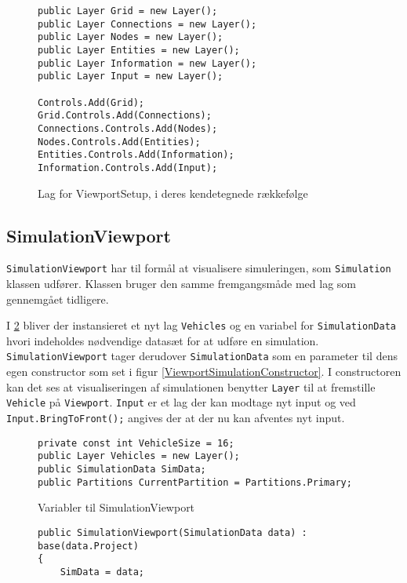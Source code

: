 {\begin{figure}[H]
\begin{lstlisting}
public Layer Grid = new Layer();
public Layer Connections = new Layer();
public Layer Nodes = new Layer();
public Layer Entities = new Layer();
public Layer Information = new Layer();
public Layer Input = new Layer();

Controls.Add(Grid);
Grid.Controls.Add(Connections);
Connections.Controls.Add(Nodes);
Nodes.Controls.Add(Entities);
Entities.Controls.Add(Information);
Information.Controls.Add(Input);
\end{lstlisting}
\caption{Lag for ViewportSetup, i deres kendetegnede rækkefølge}
\label{ViewportSetupLayers}
\end{figure}

\subsection{SimulationViewport}\label{SimulationViewport}

\texttt{SimulationViewport} har til formål at visualisere simuleringen, som \texttt{Simulation} klassen udfører. Klassen bruger den samme fremgangsmåde med lag som gennemgået tidligere.

\vspace{5mm}

I \ref{ViewPortSimulation} bliver der instansieret et nyt lag \texttt{Vehicles} og en variabel for \texttt{SimulationData} hvori indeholdes nødvendige datasæt for at udføre en simulation. \texttt{SimulationViewport} tager derudover \texttt{SimulationData} som en parameter til dens egen constructor som set i figur \ref{ViewportSimulationConstructor}. I constructoren kan det ses at visualiseringen af simulationen benytter \texttt{Layer} til at fremstille \texttt{Vehicle} på \texttt{Viewport}. \texttt{Input} er et lag der kan modtage nyt input og ved \texttt{Input.BringToFront();} angives der at der nu kan afventes nyt input. 

\begin{figure}[H]
\begin{lstlisting}
private const int VehicleSize = 16;
public Layer Vehicles = new Layer();
public SimulationData SimData;
public Partitions CurrentPartition = Partitions.Primary;
\end{lstlisting}
\caption{Variabler til SimulationViewport}
\label{ViewPortSimulation}
\end{figure}

\begin{figure}[H]
\begin{lstlisting}
public SimulationViewport(SimulationData data) : base(data.Project)
{
    SimData = data;
            

\end{lstlisting}
\end{figure}}
